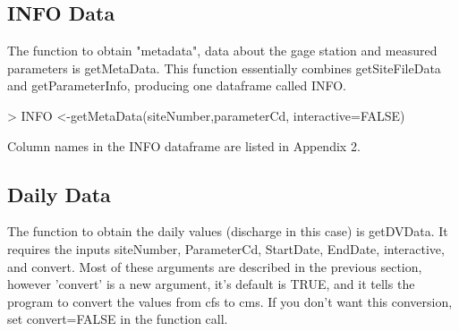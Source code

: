 \documentclass[a4paper,11pt]{article}
\begin{document}
\subsection{INFO Data}
The function to obtain "metadata", data about the gage station and measured parameters is getMetaData. This function essentially combines getSiteFileData and getParameterInfo, producing one dataframe called INFO.

\begin{Schunk}
\begin{Sinput}
> INFO <-getMetaData(siteNumber,parameterCd, interactive=FALSE)
\end{Sinput}
\end{Schunk}

Column names in the INFO dataframe are listed in Appendix 2.

\subsection{Daily Data}
The function to obtain the daily values (discharge in this case) is getDVData.  It requires the inputs siteNumber, ParameterCd, StartDate, EndDate, interactive, and convert. Most of these arguments are described in the previous section, however 'convert' is a new argument, it's default is TRUE, and it tells the program to convert the values from cfs to cms. If you don't want this conversion, set convert=FALSE in the function call.
\end{document}
